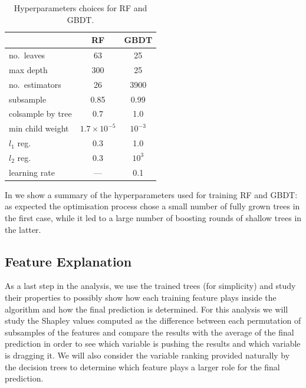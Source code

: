 \begin{table}[htbp]
\centering
\begin{tabular}{@{}lcc@{}}
\toprule
                  & \textbf{RF}          & \textbf{GBDT} \\
\midrule
no.\ leaves       & 63                   & 25            \\
max depth         & 300                  & 25            \\
no.\ estimators   & 26                   & 3900          \\
subsample         & 0.85                 & 0.99          \\
colsample by tree & 0.7                  & 1.0           \\
min child weight  & $1.7 \times 10^{-5}$ & $10^{-3}$     \\
$l_1$ reg.        & 0.3                  & 1.0           \\
$l_2$ reg.        & 0.3                  & $10^3$        \\
learning rate     & ---                  & 0.1           \\
\bottomrule
\end{tabular}%
\caption{Hyperparameters choices for RF and GBDT.}
\label{tab:ml:hyper}
\end{table}

In  we show a summary of the hyperparameters used for
training RF and GBDT: as expected the optimisation process chose a small number
of fully grown trees in the first case, while it led to a large number of
boosting rounds of shallow trees in the latter.

\subsection{Feature Explanation}\label{sec:ml:shap}

As a last step in the analysis, we use the trained trees (for simplicity) and
study their properties to possibly show how each training feature plays inside
the algorithm and how the final prediction is determined.
For this analysis we will study the Shapley values computed as the difference
between each permutation of subsamples of the features and compare the results
with the average of the final prediction in order to see which variable is
pushing the results and which variable is dragging it.
We will also consider the variable ranking provided naturally by the decision trees to determine which feature plays a larger role for the final prediction.

